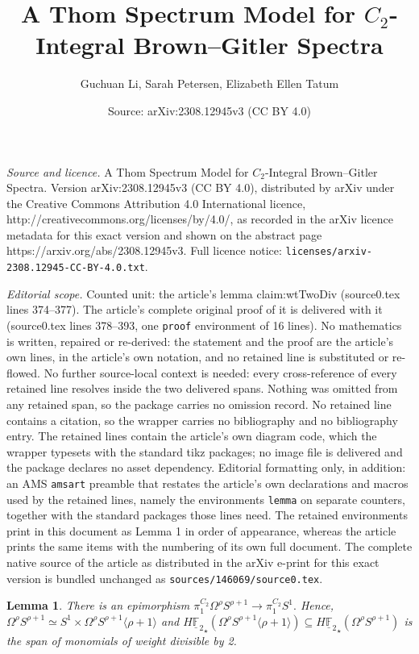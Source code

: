 \documentclass[10pt,a4paper]{amsart}
\title{A Thom Spectrum Model for $C_2$-Integral Brown--Gitler Spectra}
\author{Guchuan Li, Sarah Petersen, Elizabeth Ellen Tatum}
\date{Source: arXiv:2308.12945v3 (CC BY 4.0)}
\newtheorem{lemma}{Lemma}
\newcommand{\mF}{{\mathbb F}}
\newcommand{\umF}{\underline{\mF}}
\begin{document}
\maketitle

\noindent\emph{Source and licence.} A Thom Spectrum Model for $C_2$-Integral Brown--Gitler Spectra. Version arXiv:2308.12945v3 (CC BY 4.0), distributed by arXiv under the Creative Commons Attribution 4.0 International licence, http://creativecommons.org/licenses/by/4.0/, as recorded in the arXiv licence metadata for this exact version and shown on the abstract page https://arxiv.org/abs/2308.12945v3. Full licence notice: \texttt{licenses/arxiv-2308.12945-CC-BY-4.0.txt}.\par\smallskip

\noindent\textit{Editorial scope.} Counted unit: the article's lemma claim:wtTwoDiv (source0.tex lines 374--377). The article's complete original proof of it is delivered with it (source0.tex lines 378--393, one \texttt{proof} environment of 16 lines). No mathematics is written, repaired or re-derived: the statement and the proof are the article's own lines, in the article's own notation, and no retained line is substituted or re-flowed.  No further source-local context is needed: every cross-reference of every retained line resolves inside the two delivered spans.  Nothing was omitted from any retained span, so the package carries no omission record.  No retained line contains a citation, so the wrapper carries no bibliography and no bibliography entry.  The retained lines contain the article's own diagram code, which the wrapper typesets with the standard tikz packages; no image file is delivered and the package declares no asset dependency.  Editorial formatting only, in addition: an AMS \texttt{amsart} preamble that restates the article's own declarations and macros used by the retained lines, namely the environments \texttt{lemma} on separate counters, together with the standard packages those lines need.  The retained environments print in this document as Lemma 1 in order of appearance, whereas the article prints the same items with the numbering of its own full document.  The complete native source of the article as distributed in the arXiv e-print for this exact version is bundled unchanged as \texttt{sources/146069/source0.tex}.
 \begin{lemma}
     \label{claim:wtTwoDiv}
     There is an epimorphism $\pi_{1}^{C_2} \Omega^\rho S^{\rho + 1} \to \pi_1^{C_2} S^1.$ Hence, $\Omega^\rho S^{\rho + 1} \simeq S^1 \times \Omega^\rho S^{\rho + 1} \langle \rho + 1 \rangle$ and $H {\umF_2}_\star (\Omega^\rho S^{\rho + 1} \langle \rho + 1 \rangle ) \subseteq H {\umF_2}_\star (\Omega^\rho S^{\rho + 1})$ is the span of monomials of weight divisible by 2. 
 \end{lemma}
\end{document}
